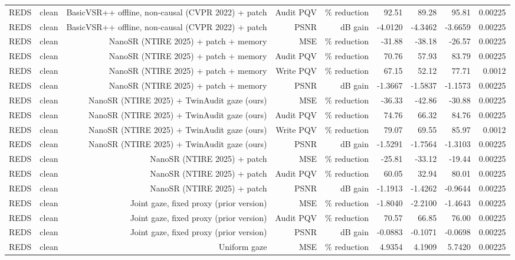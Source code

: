 \begin{table}[t]
\begin{tabular}{llrrrrrrr}
REDS & clean & BasicVSR++ offline, non-causal (CVPR 2022) + patch & Audit PQV & \% reduction & 92.51 & 89.28 & 95.81 & 0.00225 \\
REDS & clean & BasicVSR++ offline, non-causal (CVPR 2022) + patch & PSNR & dB gain & -4.0120 & -4.3462 & -3.6659 & 0.00225 \\
REDS & clean & NanoSR (NTIRE 2025) + patch + memory & MSE & \% reduction & -31.88 & -38.18 & -26.57 & 0.00225 \\
REDS & clean & NanoSR (NTIRE 2025) + patch + memory & Audit PQV & \% reduction & 70.76 & 57.93 & 83.79 & 0.00225 \\
REDS & clean & NanoSR (NTIRE 2025) + patch + memory & Write PQV & \% reduction & 67.15 & 52.12 & 77.71 & 0.0012 \\
REDS & clean & NanoSR (NTIRE 2025) + patch + memory & PSNR & dB gain & -1.3667 & -1.5837 & -1.1573 & 0.00225 \\
REDS & clean & NanoSR (NTIRE 2025) + TwinAudit gaze (ours) & MSE & \% reduction & -36.33 & -42.86 & -30.88 & 0.00225 \\
REDS & clean & NanoSR (NTIRE 2025) + TwinAudit gaze (ours) & Audit PQV & \% reduction & 74.76 & 66.32 & 84.76 & 0.00225 \\
REDS & clean & NanoSR (NTIRE 2025) + TwinAudit gaze (ours) & Write PQV & \% reduction & 79.07 & 69.55 & 85.97 & 0.0012 \\
REDS & clean & NanoSR (NTIRE 2025) + TwinAudit gaze (ours) & PSNR & dB gain & -1.5291 & -1.7564 & -1.3103 & 0.00225 \\
REDS & clean & NanoSR (NTIRE 2025) + patch & MSE & \% reduction & -25.81 & -33.12 & -19.44 & 0.00225 \\
REDS & clean & NanoSR (NTIRE 2025) + patch & Audit PQV & \% reduction & 60.05 & 32.94 & 80.01 & 0.00225 \\
REDS & clean & NanoSR (NTIRE 2025) + patch & PSNR & dB gain & -1.1913 & -1.4262 & -0.9644 & 0.00225 \\
REDS & clean & Joint gaze, fixed proxy (prior version) & MSE & \% reduction & -1.8040 & -2.2100 & -1.4643 & 0.00225 \\
REDS & clean & Joint gaze, fixed proxy (prior version) & Audit PQV & \% reduction & 70.57 & 66.85 & 76.00 & 0.00225 \\
REDS & clean & Joint gaze, fixed proxy (prior version) & PSNR & dB gain & -0.0883 & -0.1071 & -0.0698 & 0.00225 \\
REDS & clean & Uniform gaze & MSE & \% reduction & 4.9354 & 4.1909 & 5.7420 & 0.00225 \\

\end{tabular}
\end{table}
